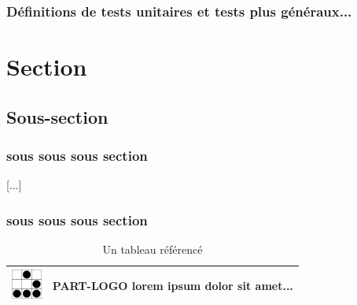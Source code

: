 \documentclass[11pt,twoside,a4paper]{article}
\begin{document}
\subsubsection{D{\'e}finitions de tests unitaires et tests plus g{\'e}n{\'e}raux...}

\clearpage



\section{Section}



\subsection{Sous-section}



\subsubsection{sous sous sous section}

[...]~\\

\subsubsection{sous sous sous section}


\begin{table}[ht]

	\begin{center}

		\begin{tabular}{|p{}|p{}|}

		\hline

			\includegraphics[width=1cm]{img/logo_glider.png}
			& 
			\textbf{PART-LOGO} lorem ipsum dolor sit amet... \\

		\hline

		\end{tabular}

	\end{center}

	\caption{Un tableau r{\'e}f{\'e}renc{\'e}}

	\label{tab:TabReference01}

\end{table}~\\
\end{document}
